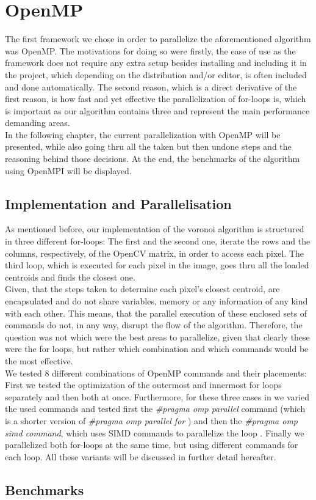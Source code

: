 \section{OpenMP}
The first framework we chose in order to parallelize the aforementioned algorithm was OpenMP. The motivations for doing so were firstly, the ease of use as the framework does not require any extra setup besides installing and including it in the project, which depending on the distribution and/or editor, is often included and done automatically. The second reason, which is a direct derivative of the first reason, is how fast and yet effective the parallelization of for-loops is, which is important as our algorithm contains three and represent the main performance demanding areas.\\

In the following chapter, the current parallelization with OpenMP will be presented, while also going thru all the taken but then undone steps and the reasoning behind those decisions. At the end, the benchmarks of the algorithm using OpenMPI will be displayed.

\subsection{Implementation and Parallelisation}

As mentioned before, our implementation of the voronoi algorithm is structured in three different for-loops: The first and the second one, iterate the rows and the columns, respectively, of the OpenCV matrix, in order to access each pixel. The third loop, which is executed for each pixel in the image, goes thru all the loaded centroids and finds the closest one.\\

Given, that the steps taken to determine each pixel’s closest centroid, are encapsulated and do not share variables, memory or any information of any kind with each other. This means, that the parallel execution of these enclosed sets of commands do not, in any way, disrupt the flow of the algorithm. Therefore, the question was not which were the best areas to parallelize, given that clearly these were the for loops, but rather which combination and which commands would be the most effective.\\

We tested 8 different combinations of OpenMP commands and their placements: First we tested the optimization of the outermost and innermost for loops separately and then both at once. Furthermore, for these three cases in we varied the used commands and tested first the \textit{\#pragma omp parallel} command (which is a shorter version of \textit{\#pragma omp parallel for} \cite{}) and then the \textit{\#pragma omp simd command}, which uses SIMD commands to parallelize the loop \cite{}. Finally we parallelized both for-loops at the same time, but using different commands for each loop. All these variants will be discussed in further detail hereafter.

\subsection{Benchmarks}
